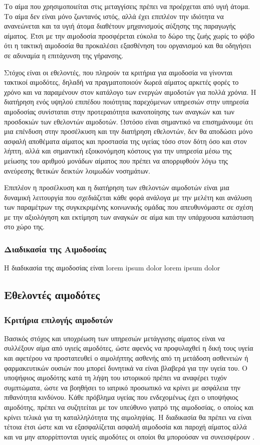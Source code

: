 	 Το αίμα που χρησιμοποιείται στις μεταγγίσεις πρέπει να προέρχεται από υγιή άτομα. Το αίμα δεν είναι μόνο ζωντανός ιστός, αλλά έχει επιπλέον την ιδιότητα να ανανεώνεται και τα υγιή άτομα διαθέτουν μηχανισμούς αύξησης της παραγωγής αίματος. Έτσι με την αιμοδοσία προσφέρεται εύκολα το δώρο της ζωής χωρίς το φόβο ότι η τακτική αιμοδοσία θα προκαλέσει εξασθένηση του οργανισμού και θα οδηγήσει σε αδυναμία η επιτάχυνση της γήρανσης.
	 
	Στόχος είναι οι εθελοντές, που πληρούν τα κριτήρια για αιμοδοσία να γίνονται τακτικοί αιμοδότες, δηλαδή να πραγματοποιούν δωρεά αίματος αρκετές φορές το χρόνο και να παραμένουν στον κατάλογο των ενεργών αιμοδοτών για πολλά χρόνια. Η διατήρηση ενός υψηλού επιπέδου ποιότητας παρεχόμενων υπηρεσιών στην υπηρεσία αιμοδοσίας συνίσταται στην προτεραιότητα ικανοποίησης των αναγκών και των προσδοκιών των εθελοντών αιμοδοτών. Ωστόσο είναι σημαντικό να επισημάνουμε ότι μια επένδυση στην προσέλκυση και την διατήρηση εθελοντών, δεν θα αποδώσει μόνο ασφαλή αποθέματα αίματος και προστασία της υγείας τόσο στον δότη όσο και στον λήπτη, αλλά και σημαντική εξοικονόμηση κόστους για την υπηρεσία μέσω της μείωσης του αριθμού μονάδων αίματος που πρέπει να απορριφθούν λόγω της ανεύρεσης θετικών δεικτών λοιμωδών νοσημάτων. 
	
	Επιπλέον η προσέλκυση και η διατήρηση των εθελοντών αιμοδοτών είναι μια δυναμική λειτουργία που σχεδιάζεται κάθε φορά ανάλογα με την μελέτη και ανάλυση των παραμέτρων της συγκεκριμένης κοινωνικής ομάδας που απευθυνόμαστε σε σχέση με την αξιολόγηση και εκτίμηση των αναγκών σε αίμα και την υπάρχουσα κατάσταση στο χώρο της.
		\subsubsection{Διαδικασία της Αιμοδοσίας}
		 Η διαδικασία της αιμοδοσίας είναι lorem ipsum dolor lorem ipsum dolor
	\subsection{Εθελοντές αιμοδότες}
		\subsubsection{Κριτήρια επιλογής αιμοδοτών} 
			Βασικός στόχος και υποχρέωση των υπηρεσιών μετάγγισης αίματος είναι να συλλέξουν αίμα από υγιείς αιμοδότες, ώστε αφενός να προφυλαχθεί η δική τους υγεία και αφετέρου να προστατευθεί ο αιμολήπτης ασθενής από τη μετάδοση ασθενειών ή φαρμακευτικών ουσιών που μπορεί δυνητικά να είναι βλαβερά για την υγεία του. Ο υποψήφιος αιμοδότης κατά τη λήψη του ιστορικού πρέπει να αναφέρει τυχόν συμπτώματα, ώστε να βοηθήσει το ιατρικό προσωπικό να κρίνει με ασφάλεια την πιθανότητα κινδύνου. Κάθε πρόβλημα υγείας που ενδεχομένως έχει ο υποψήφιος αιμοδότης, πρέπει να συζητείται με τον υπεύθυνο γιατρό της αιμοδοσίας, ο οποίος και κρίνει τελικά για τη καταλληλότητα της αιμοληψίας. Η διαδικασία θα πρέπει να είναι τέτοια έτσι ώστε και να εξασφαλίζεται ασφαλή αιμοδοσία και παροχή αίματος αλλά και να μην απορρίπτονται υγιείς αιμοδότες οι οποίοι θα μπορούσαν να συνεισφέρουν \cite{bloodDonorSelection}.
			
